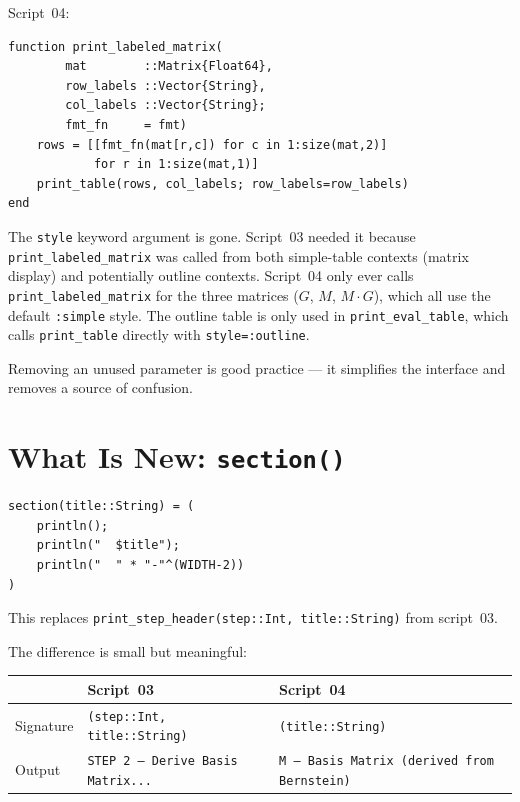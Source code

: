 \documentclass[12pt, a4paper]{article}
\newcommand{\cd}[1]{\texttt{#1}}
\begin{document}
Script~04:
\begin{verbatim}
function print_labeled_matrix(
        mat        ::Matrix{Float64},
        row_labels ::Vector{String},
        col_labels ::Vector{String};
        fmt_fn     = fmt)
    rows = [[fmt_fn(mat[r,c]) for c in 1:size(mat,2)]
            for r in 1:size(mat,1)]
    print_table(rows, col_labels; row_labels=row_labels)
end
\end{verbatim}

The \cd{style} keyword argument is gone.
Script~03 needed it because \cd{print\_labeled\_matrix}
was called from both simple-table contexts (matrix display)
and potentially outline contexts.
Script~04 only ever calls \cd{print\_labeled\_matrix} for
the three matrices ($G$, $M$, $M \cdot G$), which all use
the default \cd{:simple} style.
The outline table is only used in \cd{print\_eval\_table},
which calls \cd{print\_table} directly with
\cd{style=:outline}.

Removing an unused parameter is good practice --- it
simplifies the interface and removes a source of confusion.


\section{What Is New: \texttt{section()}}

\begin{verbatim}
section(title::String) = (
    println();
    println("  $title");
    println("  " * "-"^(WIDTH-2))
)
\end{verbatim}

This replaces \cd{print\_step\_header(step::Int, title::String)}
from script~03.

The difference is small but meaningful:

\begin{center}
\begin{tabular}{lll}
\toprule
 & Script~03 & Script~04 \\
\midrule
Signature & \cd{(step::Int, title::String)} &
  \cd{(title::String)} \\
Output & \cd{STEP 2 --- Derive Basis Matrix...} &
  \cd{M --- Basis Matrix (derived from Bernstein)} \\
\end{tabular}
\end{center}
\end{document}
